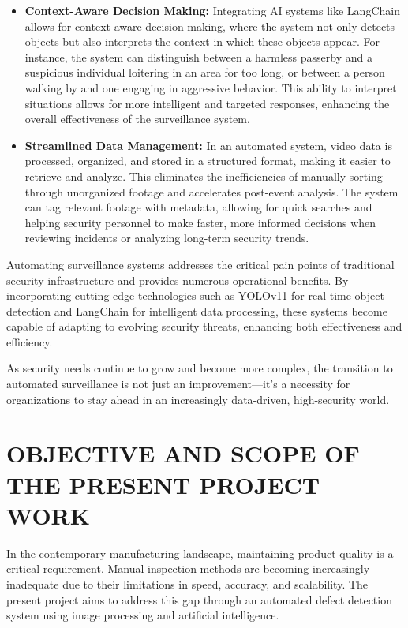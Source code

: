 \documentclass[12pt]{report}
\begin{document}
\begin{itemize}
    \item \textbf{Context-Aware Decision Making:} 
    Integrating AI systems like LangChain allows for context-aware decision-making, where the system not only detects objects but also interprets the context in which these objects appear. For instance, the system can distinguish between a harmless passerby and a suspicious individual loitering in an area for too long, or between a person walking by and one engaging in aggressive behavior. This ability to interpret situations allows for more intelligent and targeted responses, enhancing the overall effectiveness of the surveillance system.
    
    \item \textbf{Streamlined Data Management:} 
    In an automated system, video data is processed, organized, and stored in a structured format, making it easier to retrieve and analyze. This eliminates the inefficiencies of manually sorting through unorganized footage and accelerates post-event analysis. The system can tag relevant footage with metadata, allowing for quick searches and helping security personnel to make faster, more informed decisions when reviewing incidents or analyzing long-term security trends.
\end{itemize}

Automating surveillance systems addresses the critical pain points of traditional security infrastructure and provides numerous operational benefits. By incorporating cutting-edge technologies such as YOLOv11 for real-time object detection and LangChain for intelligent data processing, these systems become capable of adapting to evolving security threats, enhancing both effectiveness and efficiency.

As security needs continue to grow and become more complex, the transition to automated surveillance is not just an improvement—it's a necessity for organizations to stay ahead in an increasingly data-driven, high-security world.





\section{OBJECTIVE  AND  SCOPE OF  THE PRESENT PROJECT WORK}

In the contemporary manufacturing landscape, maintaining product quality is a critical requirement. Manual inspection methods are becoming increasingly inadequate due to their limitations in speed, accuracy, and scalability. The present project aims to address this gap through an automated defect detection system using image processing and artificial intelligence.
\end{document}
